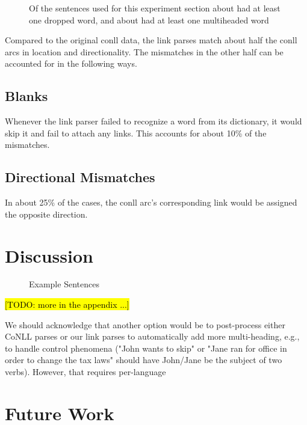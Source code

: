 \documentclass[11pt]{article}
\newcommand{\Note}[1]{}
\renewcommand{\Note}[1]{\hl{[#1]}}  %
\newcommand{\TODO}[1]{\Note{TODO: #1}}
\begin{document}
\begin{figure}[ht!]
  \centering
  \small
  
  \caption{\small Of the sentences used for this experiment section about had at least one dropped word, and about had at least one multiheaded word}
\end{figure}



Compared to the original conll data, the link parses match about half the conll arcs in location and directionality. The mismatches in the other half can be accounted for in the following ways.

\subsection{Blanks}
Whenever the link parser failed to recognize a word from its dictionary, it would skip it and fail to attach any links. This accounts for about 10\% of the mismatches.

\subsection{Directional Mismatches}
In about 25\% of the cases, the conll arc's corresponding link would be assigned the opposite direction.


\section{Discussion}


\begin{figure}[ht!]
  \centering
  
  \caption{Example Sentences}
\end{figure}

\TODO{more in the appendix ...}

We should acknowledge that another option would be to post-process either CoNLL parses or our link parses to automatically add more multi-heading, e.g., to handle control phenomena ("John wants to skip" or "Jane ran for office in order to change the tax laws" should have John/Jane be the subject of two verbs).  However, that requires per-language 



\section{Future Work}
\end{document}
